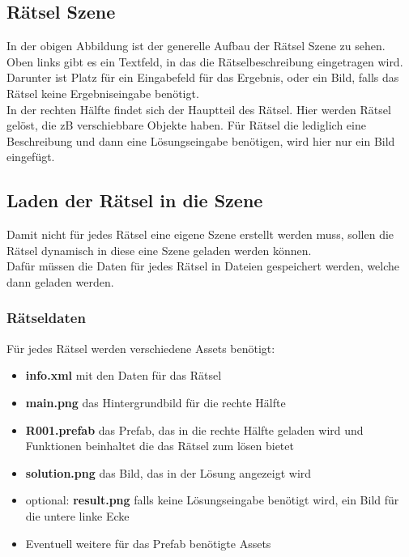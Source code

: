\subsection{Rätsel Szene}
In der obigen Abbildung ist der generelle Aufbau der Rätsel Szene zu sehen. Oben links gibt es ein Textfeld, in das die Rätselbeschreibung eingetragen wird. Darunter ist Platz für ein Eingabefeld für das Ergebnis, oder ein Bild, falls das Rätsel keine Ergebniseingabe benötigt.\\ 
In der rechten Hälfte findet sich der Hauptteil des Rätsel. Hier werden Rätsel gelöst, die zB verschiebbare Objekte haben. Für Rätsel die lediglich eine Beschreibung und dann eine Lösungseingabe benötigen, wird hier nur ein Bild eingefügt.

\subsection{Laden der Rätsel in die Szene}
Damit nicht für jedes Rätsel eine eigene Szene erstellt werden muss, sollen die Rätsel dynamisch in diese eine Szene geladen werden können.\\
Dafür müssen die Daten für jedes Rätsel in Dateien gespeichert werden, welche dann geladen werden.

\subsubsection{Rätseldaten}
Für jedes Rätsel werden verschiedene Assets benötigt:
\begin{itemize}
	\item \textbf{info.xml} mit den Daten für das Rätsel
	\item \textbf{main.png} das Hintergrundbild für die rechte Hälfte
	\item \textbf{R001.prefab} das Prefab, das in die rechte Hälfte geladen wird und Funktionen beinhaltet die das Rätsel zum lösen bietet
	\item \textbf{solution.png} das Bild, das in der Lösung angezeigt wird
	\item optional: \textbf{result.png} falls keine Lösungseingabe benötigt wird, ein Bild für die untere linke Ecke
	\item Eventuell weitere für das Prefab benötigte Assets
\end{itemize}

